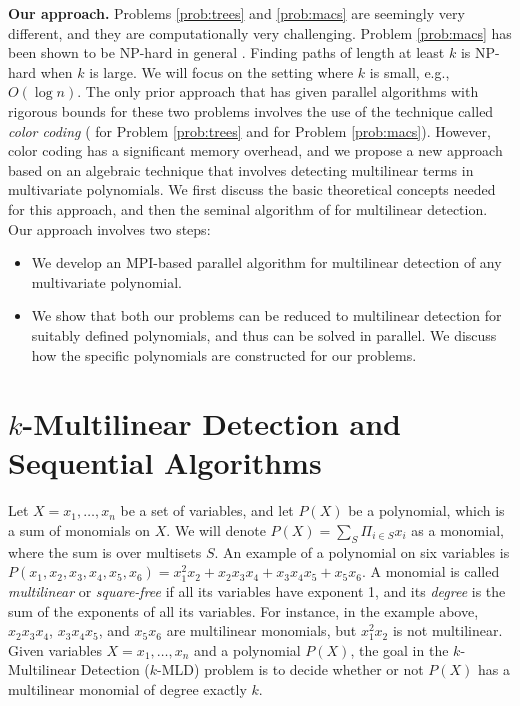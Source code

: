 \noindent
\textbf{Our approach.} Problems \ref{prob:trees} and \ref{prob:macs} are seemingly very different,
and they are computationally very challenging. Problem \ref{prob:macs}
has been shown to be NP-hard in general \cite{cadena:sdm17}. Finding paths of length at least $k$
is NP-hard when $k$ is large. We will focus on the setting where $k$ is small, e.g., $O(\log{n})$.
The only prior approach that has given parallel algorithms with rigorous bounds for these two problems involves the use of the technique called \emph{color coding} (\cite{alon2008biomolecular, huffner2008algorithm,
alon1995color} for Problem \ref{prob:trees} and \cite{cadena:sdm17} for Problem \ref{prob:macs}).
However, color coding has a significant memory overhead, and we propose a new approach
based on an algebraic technique that involves detecting multilinear terms in multivariate polynomials.
We first discuss the basic theoretical concepts needed for this approach, and then the seminal
algorithm of \cite{DBLP:journals/talg/KoutisW16, williams2009finding} for multilinear detection.
Our approach involves two steps:
\begin{itemize}
\item
We develop an MPI-based parallel algorithm for multilinear detection of any multivariate
polynomial.%
\item
We show that both our problems can be reduced to multilinear detection for suitably defined
polynomials, and thus can be solved in parallel. %
We discuss how the specific
polynomials are constructed for our problems.
\end{itemize}


\section{$k$-Multilinear Detection and Sequential Algorithms}
Let $X = x_1, \ldots,x_n$ be a set of variables, and let $P(X)$ be a polynomial, which is a sum 
of monomials on $X$. We will denote $P(X)=\sum_S \Pi_{i\in S} x_i$ as a monomial, where
the sum is over multisets $S$.  An example of a polynomial on six variables is 
$P(x_1,x_2,x_3,x_4, x_5, x_6) = x_1^2x_2 + x_2x_3x_4 + x_3x_4x_5 + x_5x_6$. 
A monomial is called \emph{multilinear} or \emph{square-free} if all its variables 
have exponent 1, and its \emph{degree} is the sum of the exponents of all its variables. 
For instance, in the example above, $x_2x_3x_4$, $x_3x_4x_5$, and $x_5x_6$ are multilinear monomials, but $x_1^2x_2$ is not multilinear. 
Given variables $X = x_1, \ldots ,x_n$ and a polynomial $P(X)$, the goal in 
the $k$-Multilinear Detection (\textsc{$k$-MLD}) problem
is to decide whether or not $P(X)$ has a multilinear monomial of degree exactly $k$. 

